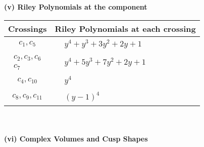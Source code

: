 \documentclass[1p]{elsarticle_modified}
\theoremstyle{definition}
\begin{document}
\newpage\renewcommand{\arraystretch}{1}
\flushleft \textbf{(v) Riley Polynomials at the component}\newline \\
\begin{tabular}{m{50pt}|m{274pt}}
Crossings & \hspace{64pt}Riley Polynomials at each crossing \\
\hline $$\begin{aligned}c_{1},c_{5}\end{aligned}$$&$\begin{aligned}
&y^4+y^3+3 y^2+2 y+1
\end{aligned}$\\
\hline $$\begin{aligned}c_{2},c_{3},c_{6}\\c_{7}\end{aligned}$$&$\begin{aligned}
&y^4+5 y^3+7 y^2+2 y+1
\end{aligned}$\\
\hline $$\begin{aligned}c_{4},c_{10}\end{aligned}$$&$\begin{aligned}
&y^4
\end{aligned}$\\
\hline $$\begin{aligned}c_{8},c_{9},c_{11}\end{aligned}$$&$\begin{aligned}
&(y-1)^4
\end{aligned}$\\
\hline
\end{tabular}\\~\\
\newpage\flushleft \textbf{(vi) Complex Volumes and Cusp Shapes}
\end{document}
